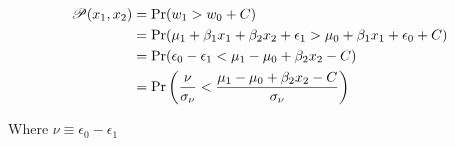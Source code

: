 \begin{align*}
    \mathscr{P}(x_1, x_2) &= \Pr(w_1 > w_0 + C) \\
    &= \Pr(\mu_1 + \beta_1 x_1 + \beta_2 x_2 + \epsilon_1 > \mu_0 + \beta_1 x_1  + \epsilon_0 + C) \\
    &= \Pr(\epsilon_0 - \epsilon_1 < 
        \mu_1 - \mu_0 + \beta_2 x_2 - C
    ) \\
    &= \Pr\left(
        \frac{\nu}{\sigma_\nu} < 
        \frac{\mu_1 - \mu_0 + \beta_2 x_2 - C}{\sigma_\nu}
        \right)
\end{align*}

Where $\nu \equiv \epsilon_0 - \epsilon_1$

